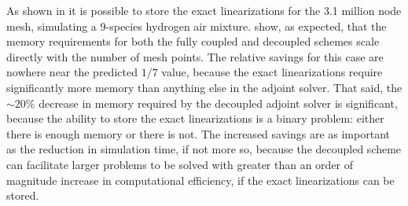 As shown in  it is possible to store the exact
linearizations for the 3.1 million node mesh, simulating a 9-species hydrogen
air mixture.   show, as expected, that the memory
requirements for both the fully coupled and decoupled schemes scale directly
with the number of mesh points.  The relative savings for this case are nowhere
near the predicted $1/7$ value, because the exact linearizations require
significantly more memory than anything else in the adjoint solver.  That said,
the $\sim 20\%$ decrease in memory required by the decoupled adjoint solver is
significant, because the ability to store the exact linearizations is a binary
problem: either there is enough memory or there is not.  The increased savings
are as important as the reduction in simulation time, if not more so, because
the decoupled scheme can facilitate larger problems to be solved with greater
than an order of magnitude increase in computational efficiency, if the exact
linearizations can be stored.
